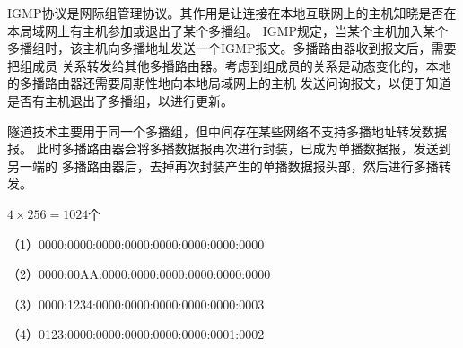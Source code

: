 \documentclass{ctexart}
\begin{document}
    \answer[4-43]
IGMP协议是网际组管理协议。其作用是让连接在本地互联网上的主机知晓是否在本局域网上有主机参加或退出了某个多播组。
IGMP规定，当某个主机加入某个多播组时，该主机向多播地址发送一个IGMP报文。多播路由器收到报文后，需要把组成员
关系转发给其他多播路由器。考虑到组成员的关系是动态变化的，本地的多播路由器还需要周期性地向本地局域网上的主机
发送问询报文，以便于知道是否有主机退出了多播组，以进行更新。

隧道技术主要用于同一个多播组，但中间存在某些网络不支持多播地址转发数据报。
此时多播路由器会将多播数据报再次进行封装，已成为单播数据报，发送到另一端的
多播路由器后，去掉再次封装产生的单播数据报头部，然后进行多播转发。

    \answer[4-48]
$4\times 256=1024$个

    \answer[4-65]
（1）0000:0000:0000:0000:0000:0000:0000:0000

\quad（2）0000:00AA:0000:0000:0000:0000:0000:0000

\quad（3）0000:1234:0000:0000:0000:0000:0000:0003

\quad（4）0123:0000:0000:0000:0000:0000:0001:0002
\end{document}
